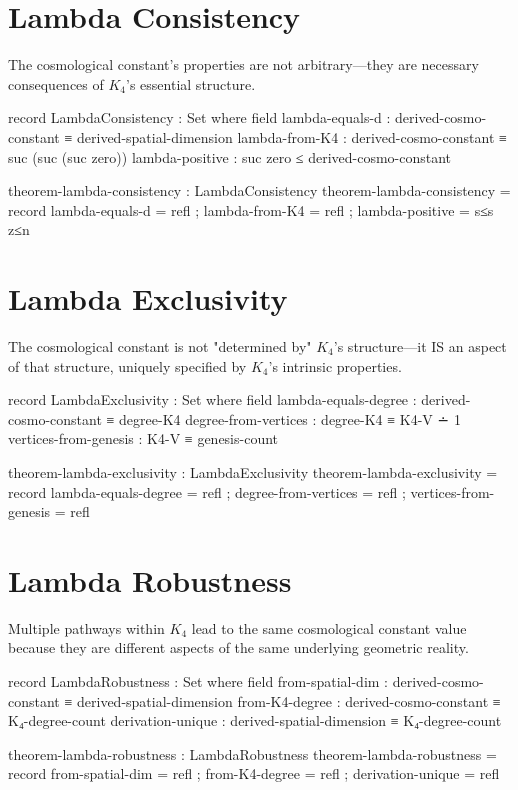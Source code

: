\documentclass[11pt,a4paper]{book}
\begin{document}
\section{Lambda Consistency}

The cosmological constant's properties are not arbitrary—they are necessary consequences of $K_4$'s essential structure.

\begin{code}
record LambdaConsistency : Set where
  field
    lambda-equals-d     : derived-cosmo-constant ≡ derived-spatial-dimension
    lambda-from-K4      : derived-cosmo-constant ≡ suc (suc (suc zero))
    lambda-positive     : suc zero ≤ derived-cosmo-constant

theorem-lambda-consistency : LambdaConsistency
theorem-lambda-consistency = record
  { lambda-equals-d = refl
  ; lambda-from-K4  = refl
  ; lambda-positive = s≤s z≤n
  }
\end{code}

\section{Lambda Exclusivity}

The cosmological constant is not "determined by" $K_4$'s structure—it IS an aspect of that structure, uniquely specified by $K_4$'s intrinsic properties.

\begin{code}
record LambdaExclusivity : Set where
  field
    lambda-equals-degree : derived-cosmo-constant ≡ degree-K4
    degree-from-vertices : degree-K4 ≡ K4-V ∸ 1
    vertices-from-genesis : K4-V ≡ genesis-count

theorem-lambda-exclusivity : LambdaExclusivity
theorem-lambda-exclusivity = record
  { lambda-equals-degree = refl
  ; degree-from-vertices = refl
  ; vertices-from-genesis = refl
  }
\end{code}

\section{Lambda Robustness}

Multiple pathways within $K_4$ lead to the same cosmological constant value because they are different aspects of the same underlying geometric reality.

\begin{code}
record LambdaRobustness : Set where
  field
    from-spatial-dim   : derived-cosmo-constant ≡ derived-spatial-dimension
    from-K4-degree     : derived-cosmo-constant ≡ K₄-degree-count
    derivation-unique  : derived-spatial-dimension ≡ K₄-degree-count

theorem-lambda-robustness : LambdaRobustness
theorem-lambda-robustness = record
  { from-spatial-dim  = refl
  ; from-K4-degree    = refl
  ; derivation-unique = refl
  }
\end{code}
\end{document}
